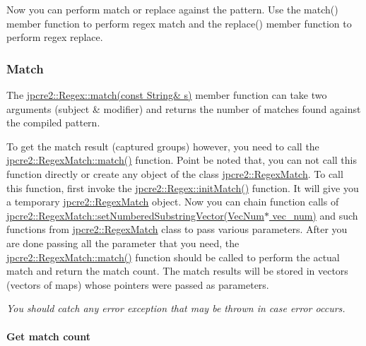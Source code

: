 Now you can perform match or replace against the pattern. Use the {\ttfamily match()} member function to perform regex match and the {\ttfamily replace()} member function to perform regex replace.\hypertarget{index_match}{}\subsubsection{Match}\label{index_match}
The {\ttfamily \hyperlink{classjpcre2_1_1Regex_a9ffbb6aa54cb97125f1b4211bc1d09a5}{jpcre2\+::\+Regex\+::match(const String\& s)}} member function can take two arguments (subject \& modifier) and returns the number of matches found against the compiled pattern.

To get the match result (captured groups) however, you need to call the {\ttfamily \hyperlink{classjpcre2_1_1RegexMatch_a5868aef3a146594ea1ebef34d122bb33}{jpcre2\+::\+Regex\+Match\+::match()}} function. Point be noted that, you can not call this function directly or create any object of the class {\ttfamily \hyperlink{classjpcre2_1_1RegexMatch}{jpcre2\+::\+Regex\+Match}}. To call this function, first invoke the {\ttfamily \hyperlink{classjpcre2_1_1Regex_a519b0915bf1163c6ce6a4d674b30cfcd}{jpcre2\+::\+Regex\+::init\+Match()}} function. It will give you a temporary {\ttfamily \hyperlink{classjpcre2_1_1RegexMatch}{jpcre2\+::\+Regex\+Match}} object. Now you can chain function calls of {\ttfamily \hyperlink{classjpcre2_1_1RegexMatch_a2c7efe1ec2e13827f670db4ecedcd0a0}{jpcre2\+::\+Regex\+Match\+::set\+Numbered\+Substring\+Vector(\+Vec\+Num$\ast$ vec\+\_\+num)}} and such functions from {\ttfamily \hyperlink{classjpcre2_1_1RegexMatch}{jpcre2\+::\+Regex\+Match}} class to pass various parameters. After you are done passing all the parameter that you need, the {\ttfamily \hyperlink{classjpcre2_1_1RegexMatch_a5868aef3a146594ea1ebef34d122bb33}{jpcre2\+::\+Regex\+Match\+::match()}} function should be called to perform the actual match and return the match count. The match results will be stored in vectors (vectors of maps) whose pointers were passed as parameters.

{\itshape You should catch any error exception that may be thrown in case error occurs.}\hypertarget{index_simple-match-count}{}\paragraph{Get match count}\label{index_simple-match-count}

